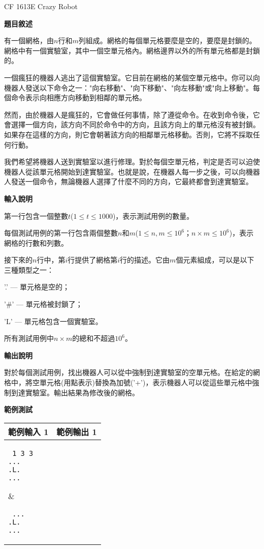     \problem CF 1613E Crazy Robot
    
    \textbf{題目敘述}

    有一個網格，由$n$行和$m$列組成。網格的每個單元格要麼是空的，要麼是封鎖的。網格中有一個實驗室，其中一個空單元格內。網格邊界以外的所有單元格都是封鎖的。

    一個瘋狂的機器人逃出了這個實驗室。它目前在網格的某個空單元格中。你可以向機器人發送以下命令之一："向右移動"、"向下移動"、"向左移動"或"向上移動"。每個命令表示向相應方向移動到相鄰的單元格。
    
    然而，由於機器人是瘋狂的，它會做任何事情，除了遵從命令。在收到命令後，它會選擇一個方向，該方向不同於命令中的方向，且該方向上的單元格沒有被封鎖。如果存在這樣的方向，則它會朝著該方向的相鄰單元格移動。否則，它將不採取任何行動。
    
    我們希望將機器人送到實驗室以進行修理。對於每個空單元格，判定是否可以迫使機器人從該單元格開始到達實驗室。也就是說，在機器人每一步之後，可以向機器人發送一個命令，無論機器人選擇了什麼不同的方向，它最終都會到達實驗室。

    \textbf{輸入說明}

    第一行包含一個整數$t$($1 \le t \le 1000$)，表示測試用例的數量。
    
    每個測試用例的第一行包含兩個整數$n$和$m$($1 \le n, m \le 10^6$；$n \times m \le 10^6$)，表示網格的行數和列數。
    
    接下來的$n$行中，第$i$行提供了網格第$i$行的描述。它由$m$個元素組成，可以是以下三種類型之一：
    
    '.' — 單元格是空的；
    
    '\#' — 單元格被封鎖了；
    
    'L' — 單元格包含一個實驗室。
    
    所有測試用例中$n \times m$的總和不超過$10^6$。

    \textbf{輸出說明}

    對於每個測試用例，找出機器人可以從中強制到達實驗室的空單元格。在給定的網格中，將空單元格(用點表示)替換為加號('+')，表示機器人可以從這些單元格中強制到達實驗室。輸出結果為修改後的網格。
    
    \textbf{範例測試}

    \begin{tabular}{|m{7cm}|m{7cm}|}
        \hline
        範例輸入 1 & 範例輸出 1 \\
        \hline
        \parbox[t]{7cm} %
        { \tt
        1
        3 3 \\ 
        ... \\
        .L. \\
        ... \\      
        } &
        \parbox[t]{7cm}
        { \tt
        ... \\
        .L. \\
        ... \\
        } \\
        \hline
    \end{tabular}